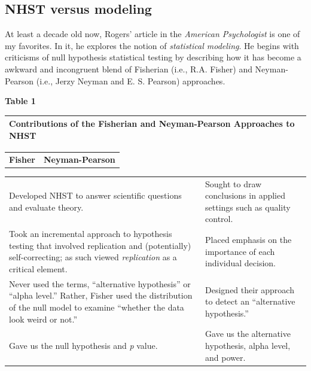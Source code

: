 \documentclass[
  english,
]{book}
\begin{document}
\hypertarget{nhst-versus-modeling}{%
\subsection{NHST versus modeling}\label{nhst-versus-modeling}}

At least a decade old now, Rogers' \citeyearpar{rodgers_epistemology_2010} article in the \emph{American Psychologist} is one of my favorites. In it, he explores the notion of \emph{statistical modeling}. He begins with criticisms of null hypothesis statistical testing by describing how it has become a awkward and incongruent blend of Fisherian (i.e., R.A. Fisher) and Neyman-Pearson (i.e., Jerzy Neyman and E. S. Pearson) approaches.

\textbf{Table 1}

\begin{longtable}[]{@{}
  >{\raggedright\arraybackslash}p{}@{}}
\toprule
Contributions of the Fisherian and Neyman-Pearson Approaches to NHST \citep{rodgers_epistemology_2010} \\
\midrule
\endhead
\bottomrule
\end{longtable}

\begin{longtable}[]{@{}cc@{}}
\toprule
& \\
\midrule
\endhead
\textbf{Fisher} & \textbf{Neyman-Pearson} \\
\bottomrule
\end{longtable}

\begin{longtable}[]{@{}
  >{\raggedright\arraybackslash}p{}
  >{\raggedright\arraybackslash}p{}@{}}
\toprule
& \\
\midrule
\endhead
Developed NHST to answer scientific questions and evaluate theory. & Sought to draw conclusions in applied settings such as quality control. \\
Took an incremental approach to hypothesis testing that involved replication and (potentially) self-correcting; as such viewed \emph{replication} as a critical element. & Placed emphasis on the importance of each individual decision. \\
Never used the terms, ``alternative hypothesis'' or ``alpha level.'' Rather, Fisher used the distribution of the null model to examine ``whether the data look weird or not.'' & Designed their approach to detect an ``alternative hypothesis.'' \\
Gave us the null hypothesis and \emph{p} value. & Gave us the alternative hypothesis, alpha level, and power. \\
\bottomrule
\end{longtable}
\end{document}
